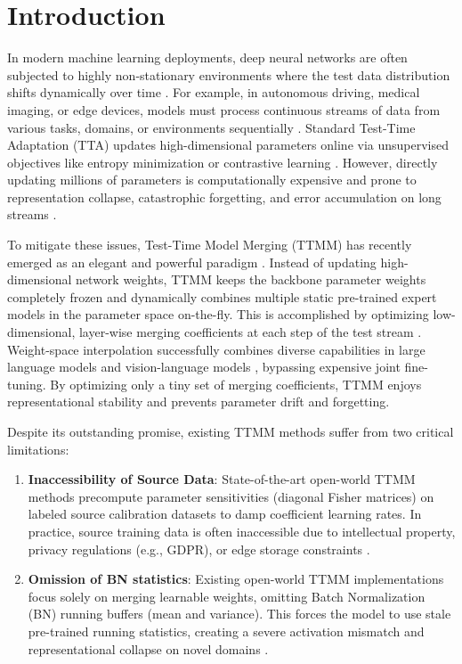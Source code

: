 \documentclass{article}
\theoremstyle{plain}
\theoremstyle{definition}
\theoremstyle{remark}
\begin{document}
\section{Introduction}
\label{sec:intro}
In modern machine learning deployments, deep neural networks are often subjected to highly non-stationary environments where the test data distribution shifts dynamically over time \cite{liang2023comprehensive, cygert2026realistic, sreenivas2024effectiveness}. For example, in autonomous driving, medical imaging, or edge devices, models must process continuous streams of data from various tasks, domains, or environments sequentially \cite{gong2022note, song2023ecotta, lee2025stabilizing}. Standard Test-Time Adaptation (TTA) updates high-dimensional parameters online via unsupervised objectives like entropy minimization \cite{wang2021tent} or contrastive learning \cite{chen2022contrastive}. However, directly updating millions of parameters is computationally expensive and prone to representation collapse, catastrophic forgetting, and error accumulation on long streams \cite{gong2022note, song2023ecotta, lee2025stabilizing}.

To mitigate these issues, Test-Time Model Merging (TTMM) has recently emerged as an elegant and powerful paradigm \cite{bertolissi2025local, t3_model_merging_2024, yang2024adamerging, zhao2024, song2026model}. Instead of updating high-dimensional network weights, TTMM keeps the backbone parameter weights completely frozen and dynamically combines multiple static pre-trained expert models in the parameter space on-the-fly. This is accomplished by optimizing low-dimensional, layer-wise merging coefficients at each step of the test stream \cite{tang2025merging, zhao2025dmposa, xu2026amee}. Weight-space interpolation successfully combines diverse capabilities in large language models \cite{wu2025unlocking} and vision-language models \cite{chen2025bring}, bypassing expensive joint fine-tuning. By optimizing only a tiny set of merging coefficients, TTMM enjoys representational stability and prevents parameter drift and forgetting.

Despite its outstanding promise, existing TTMM methods suffer from two critical limitations:
\begin{enumerate}
    \item \textbf{Inaccessibility of Source Data}: State-of-the-art open-world TTMM methods \cite{fp_ow_2026, igg_ow_2026} precompute parameter sensitivities (diagonal Fisher matrices) on labeled source calibration datasets to damp coefficient learning rates. In practice, source training data is often inaccessible due to intellectual property, privacy regulations (e.g., GDPR), or edge storage constraints \cite{dai2025free}.
    \item \textbf{Omission of BN statistics}: Existing open-world TTMM implementations focus solely on merging learnable weights, omitting Batch Normalization (BN) running buffers (mean and variance). This forces the model to use stale pre-trained running statistics, creating a severe activation mismatch and representational collapse on novel domains \cite{dr_fisher_2026}.
\end{enumerate}
\end{document}
